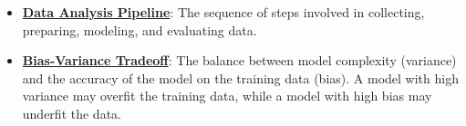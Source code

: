 \documentclass{article}%
\begin{document}
\begin{itemize}[leftmargin=*]
\item \href{https://purdue.brightspace.com/d2l/common/assets/pdfjs-d2l-dist/1.0.14-legacy/web/viewer.html?file=\%2Fcontent\%2Fenforced\%2F1095467-wl.202510.CS.24300.001\%2F10L1-CrossValidation.pdf\%3Fou\%3D1095467\&lang=en-us\&container=d2l-fileviewer-rendered-pdf\&fullscreen=d2l-fileviewer-rendered-pdf-dialog\&height=667#page=26}{\textbf{Data Analysis Pipeline}}: The sequence of steps involved in collecting, preparing, modeling, and evaluating data.%
\item \href{https://purdue.brightspace.com/d2l/common/assets/pdfjs-d2l-dist/1.0.14-legacy/web/viewer.html?file=\%2Fcontent\%2Fenforced\%2F1095467-wl.202510.CS.24300.001\%2F11L2-svd-pca-recommender.pdf\%3Fou\%3D1095467\&lang=en-us\&container=d2l-fileviewer-rendered-pdf\&fullscreen=d2l-fileviewer-rendered-pdf-dialog\&height=667#page=53}{\textbf{Bias-Variance Tradeoff}}: The balance between model complexity (variance) and the accuracy of the model on the training data (bias). A model with high variance may overfit the training data, while a model with high bias may underfit the data.%
\end{itemize}

%
\end{document}
